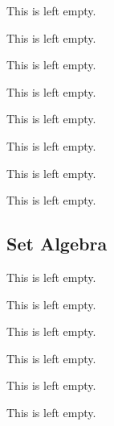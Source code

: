 \begin{example}
    This is left empty.
\end{example}

\begin{example}
    This is left empty.
\end{example}

\begin{remark}
    This is left empty.
\end{remark}

\begin{definition}
    This is left empty.
\end{definition}

\begin{example}
    This is left empty.
\end{example}

\begin{definition}
    This is left empty.
\end{definition}

\begin{example}
    This is left empty.
\end{example}

\begin{remark}
    This is left empty.
\end{remark}

\subsection{Set Algebra}

\begin{example}
    This is left empty.
\end{example}

\begin{remark}
    This is left empty.
\end{remark}

\begin{definition}
    This is left empty.
\end{definition}

\begin{proposition}
    This is left empty.
\end{proposition}

\begin{definition}
    This is left empty.
\end{definition}

\begin{proposition}
    This is left empty.
\end{proposition}

